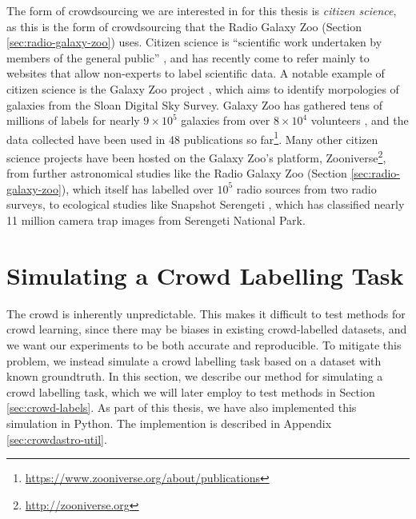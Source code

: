     The form of crowdsourcing we are interested in for this thesis is
    \emph{citizen science}, as this is the form of crowdsourcing that the Radio
    Galaxy Zoo (Section \ref{sec:radio-galaxy-zoo}) uses. Citizen science is
    ``scientific work undertaken by members of the general public''
    \citep{oed-citizenscience, marshall15}, and has recently come to refer
    mainly to websites that allow non-experts to label scientific data. A
    notable example of citizen science is the Galaxy Zoo project
    \citep{lintott08}, which aims to identify morpologies of galaxies from the
    Sloan Digital Sky Survey. Galaxy Zoo has gathered tens of millions of labels
    for nearly $9 \times 10^5$ galaxies from over $8 \times 10^4$ volunteers
    \citep{lintott11}, and the data collected have been used in 48 publications
    so far\footnote{\url{https://www.zooniverse.org/about/publications}}. Many
    other citizen science projects have been hosted on the Galaxy Zoo's
    platform, Zooniverse\footnote{\url{http://zooniverse.org}}, from further
    astronomical studies like the Radio Galaxy Zoo \citep{banfield15} (Section
    \ref{sec:radio-galaxy-zoo}), which itself has labelled over $10^5$ radio
    sources from two radio surveys, to ecological studies like Snapshot
    Serengeti \citep{swanson15}, which has classified nearly 11 million camera
    trap images from Serengeti National Park.


\section{Simulating a Crowd Labelling Task}
\label{sec:crowd-simulation}

    The crowd is inherently unpredictable. This makes it difficult to test
    methods for crowd learning, since there may be biases in existing
    crowd-labelled datasets, and we want our experiments to be both accurate and
    reproducible. To mitigate this problem, we instead simulate a crowd
    labelling task based on a dataset with known groundtruth. In this section,
    we describe our method for simulating a crowd labelling task, which we will
    later employ to test methods in Section \ref{sec:crowd-labels}. As part of
    this thesis, we have also implemented this simulation in Python. The
    implemention is described in Appendix \ref{sec:crowdastro-util}.

